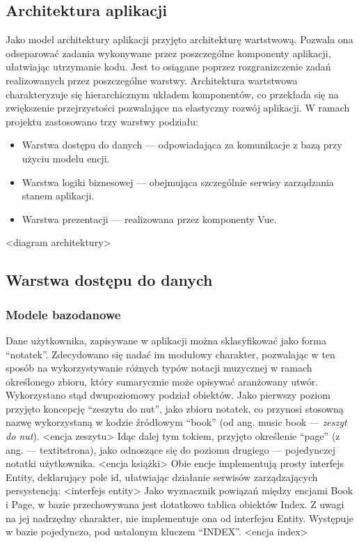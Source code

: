 \subsection{Architektura aplikacji}
Jako model architektury aplikacji przyjęto architekturę wartstwową. Pozwala ona odseparować zadania wykonywane przez
poszczególne komponenty aplikacji, ułatwiając utrzymanie kodu. Jest to osiągane poprzez rozgranizczenie zadań
realizowanych przez poszczególne warstwy. Architektura wartstwowa charakteryzuje się hierarchicznym układem komponentów,
co przekłada się na zwiększenie przejrzystości pozwalające na elastyczny rozwój aplikacji.
W ramach projektu zastosowano trzy warstwy podziału:
\begin{itemize}
	\item Warstwa dostępu do danych — odpowiadająca za komunikacje z bazą przy użyciu modelu encji.
	\item Warstwa logiki biznesowej — obejmująca szczególnie serwisy zarządzania stanem aplikacji.
	\item Warstwa prezentacji — realizowana przez komponenty Vue.
\end{itemize}
<diagram architektury>
\subsection{Warstwa dostępu do danych}
\subsubsection{Modele bazodanowe}
Dane użytkownika, zapisywane w aplikacji można sklasyfikować jako forma \enquote{notatek}.
Zdecydowano się nadać im modułowy charakter, pozwalając w ten sposób na wykorzystywanie różnych typów notacji muzycznej
w ramach określonego zbioru, który sumarycznie może opisywać aranżowany utwór.
Wykorzystano stąd dwupoziomowy podział obiektów. Jako pierwszy poziom przyjęto koncepcję
\enquote{zeszytu do nut}, jako zbioru notatek,
co przynosi stosowną nazwę wykorzystaną w kodzie źródłowym \enquote{book} (od ang.
music book — \textit{zeszyt do nut}).
<encja zeszytu>
Idąc dalej tym tokiem, przyjęto określenie \enquote{page} (z ang. — textit{strona}),
jako odnoszące się do poziomu drugiego — pojedynczej notatki użytkownika.
<encja książki>
Obie encje implementują prosty interfejs Entity, deklarujący pole id,
ułatwiając działanie serwisów zarządzających persystencją:
<interfejs entity>
Jako wyznacznik powiązań między encjami Book i Page, w bazie przechowywana jest dotatkowo tablica obiektów Index.
Z uwagi na jej nadrzędny charakter, nie implementuje ona od interfejsu Entity. Występuje w bazie pojedynczo, pod ustalonym
kluczem \enquote{INDEX}.
<encja index>
